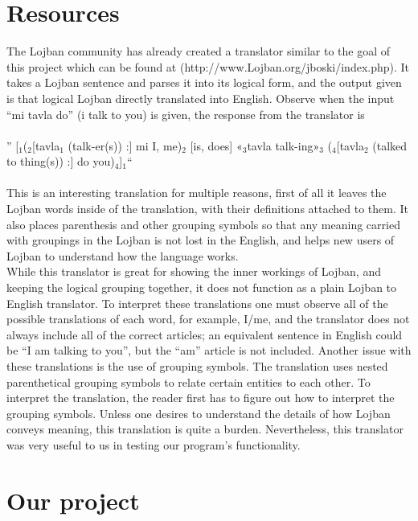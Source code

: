 \documentclass[11pt,letterpaper]{article}
\begin{document}
\section{Resources}

	The Lojban community has already created a translator similar to the goal of this project which can be found at (http://www.Lojban.org/jboski/index.php). It takes a Lojban sentence and parses it into its logical form, and the output given is that logical Lojban directly translated into English. Observe when the input “mi tavla do” (i talk to you) is given, the response from the translator is\\\\” [$_1$($_2$[tavla$_1$ (talk-er(s)) :] mi I, me)$_2$ [is, does] «$_3$tavla talk-ing»$_3$ ($_4$[tavla$_2$ (talked to thing(s)) :] do you)$_4$]$_1 $“\\\\This is an interesting translation for multiple reasons, first of all it leaves the Lojban words inside of the translation, with their definitions attached to them. It also places parenthesis and other grouping symbols so that any meaning carried with groupings in the Lojban is not lost in the English, and helps new users of Lojban to understand how the language works. \\

	While this translator is great for showing the inner workings of Lojban, and keeping the logical grouping together, it does not function as a plain Lojban to English translator. To interpret these translations one must observe all of the possible translations of each word, for example, I/me, and the translator does not always include all of the correct articles; an equivalent sentence in English could be “I am talking to you”, but the “am” article is not included.  Another issue with these translations is the use of grouping symbols.  The translation uses nested parenthetical grouping symbols to relate certain entities to each other. To interpret the translation, the reader first has to figure out how to interpret the grouping symbols. Unless one desires to understand the details of how Lojban conveys meaning, this translation is quite a burden.  Nevertheless, this translator was very useful to us in testing our program’s functionality. \\ 


\section{Our project}
\end{document}

